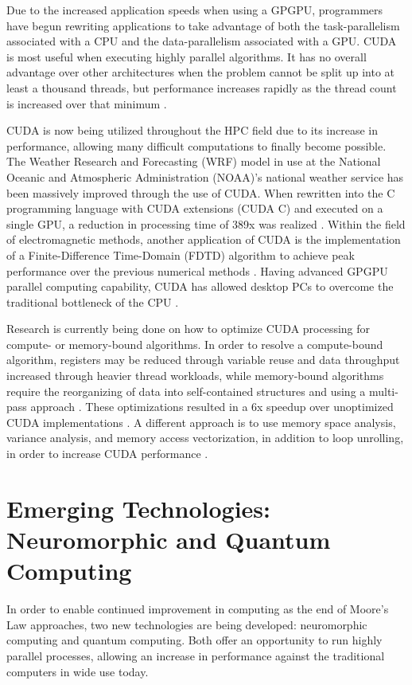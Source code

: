 \documentclass[twocolumn,12pt, singlespace]{IEEEtran}
\begin{document}
Due to the increased application speeds when using a GPGPU, programmers have begun rewriting applications to take advantage of both the task-parallelism associated with a CPU and the data-parallelism associated with a GPU. CUDA is most useful when executing highly parallel algorithms. It has no overall advantage over other architectures when the problem cannot be split up into at least a thousand threads, but performance increases rapidly as the thread count is increased over that minimum \cite{Ghorpade:2012}.

CUDA is now being utilized throughout the HPC field due to its increase in performance, allowing many difficult computations to finally become possible. The Weather Research and Forecasting (WRF) model in use at the National Oceanic and Atmospheric Administration (NOAA)'s national weather service has been massively improved through the use of CUDA. When rewritten into the C programming language with CUDA extensions (CUDA C) and executed on a single GPU, a reduction in processing time of 389x was realized \cite{Mielikainen:2012}. Within the field of electromagnetic methods, another application of CUDA is the implementation of a Finite-Difference Time-Domain (FDTD) algorithm to achieve peak performance over the previous numerical methods \cite{Donno:2010}. Having advanced GPGPU parallel computing capability, CUDA has allowed desktop PCs to overcome the traditional bottleneck of the CPU \cite{Ghorpade:2012}.

Research is currently being done on how to optimize CUDA processing for compute- or memory-bound algorithms. In order to resolve a compute-bound algorithm, registers may be reduced through variable reuse and data throughput increased through heavier thread workloads, while memory-bound algorithms require the reorganizing of data into self-contained structures and using a multi-pass approach \cite{Lee:2012}. These optimizations resulted in a 6x speedup over unoptimized CUDA implementations \cite{Lee:2012}. A different approach is to use memory space analysis, variance analysis, and memory access vectorization, in addition to loop unrolling, in order to increase CUDA performance \cite{Chakrabarti:2012}.

\section{Emerging Technologies: Neuromorphic and Quantum Computing}

In order to enable continued improvement in computing as the end of Moore's Law approaches, two new technologies are being developed: neuromorphic computing and quantum computing. Both offer an opportunity to run highly parallel processes, allowing an increase in performance against the traditional computers in wide use today.
\end{document}
